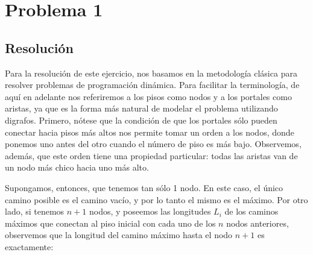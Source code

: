\documentclass{article}
\theoremstyle{definition}
\theoremstyle{remark}
\begin{document}
{} %

\subtitulo{}
\grupo{}

 
\maketitle

\pagebreak

\tableofcontents

\pagebreak


\section{Problema 1}

\subsection{Resolución}

Para la resolución de este ejercicio, nos basamos en la metodología clásica para resolver problemas de programación dinámica. Para facilitar la terminología, de aquí en adelante nos referiremos a los pisos como nodos y a los portales como aristas, ya que es la forma más natural de modelar el problema utilizando digrafos. Primero, nótese que la condición de que los portales sólo pueden conectar hacia pisos más altos nos permite tomar un orden a los nodos, donde ponemos uno antes del otro cuando el número de piso es más bajo. Observemos, además, que este orden tiene una propiedad particular: todas las aristas van de un nodo más chico hacia uno más alto.

Supongamos, entonces, que tenemos tan sólo 1 nodo. En este caso, el único camino posible es el camino vacío, y por lo tanto el mismo es el máximo. Por otro lado, si tenemos $n + 1$ nodos, y poseemos las longitudes $L_i$ de los caminos máximos que conectan al piso inicial con cada uno de los $n$ nodos anteriores, observemos que la longitud del camino máximo hasta el nodo $n + 1$ es exactamente:
\end{document}
